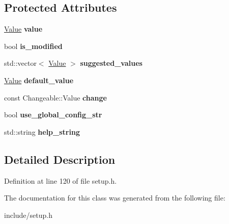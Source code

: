 \subsection*{Protected Attributes}
\begin{DoxyCompactItemize}
\item 
\hypertarget{classProperty_ab9f796553f3beee1cc6a4c4a9d352f28}{\hyperlink{classValue}{Value} {\bfseries value}}\label{classProperty_ab9f796553f3beee1cc6a4c4a9d352f28}

\item 
\hypertarget{classProperty_a478478c72fd7da282d03c652f567bc68}{bool {\bfseries is\-\_\-modified}}\label{classProperty_a478478c72fd7da282d03c652f567bc68}

\item 
\hypertarget{classProperty_a358f5bbc412ec7db0f8ae400eb419d9a}{std\-::vector$<$ \hyperlink{classValue}{Value} $>$ {\bfseries suggested\-\_\-values}}\label{classProperty_a358f5bbc412ec7db0f8ae400eb419d9a}

\item 
\hypertarget{classProperty_adafc47b2053f75c1bb1811bcf7ffdd1a}{\hyperlink{classValue}{Value} {\bfseries default\-\_\-value}}\label{classProperty_adafc47b2053f75c1bb1811bcf7ffdd1a}

\item 
\hypertarget{classProperty_a8a01484c2e7a8cfcf98f01ed3a0fa293}{const Changeable\-::\-Value {\bfseries change}}\label{classProperty_a8a01484c2e7a8cfcf98f01ed3a0fa293}

\item 
\hypertarget{classProperty_abd3b538752e5d6d649dc323ce46591be}{bool {\bfseries use\-\_\-global\-\_\-config\-\_\-str}}\label{classProperty_abd3b538752e5d6d649dc323ce46591be}

\item 
\hypertarget{classProperty_a9a0f13a48b56868da27ec1e33fd0414c}{std\-::string {\bfseries help\-\_\-string}}\label{classProperty_a9a0f13a48b56868da27ec1e33fd0414c}

\end{DoxyCompactItemize}


\subsection{Detailed Description}


Definition at line 120 of file setup.\-h.



The documentation for this class was generated from the following file\-:\begin{DoxyCompactItemize}
\item 
include/setup.\-h\end{DoxyCompactItemize}
